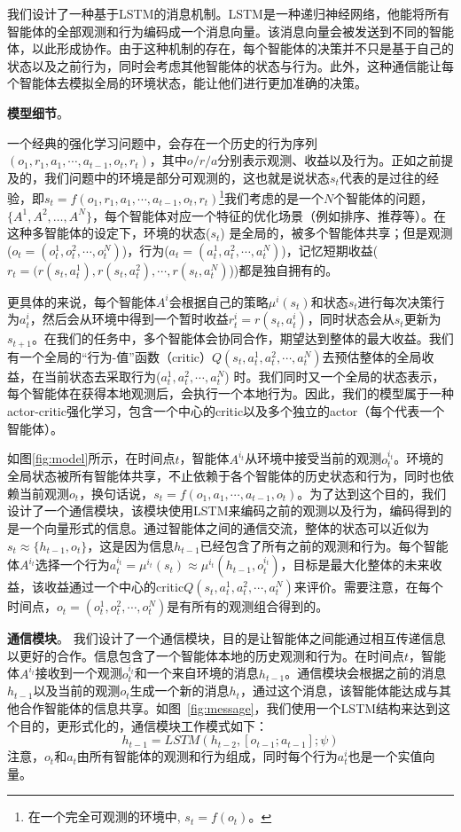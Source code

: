 我们设计了一种基于LSTM的消息机制。LSTM是一种递归神经网络，他能将所有智能体的全部观测和行为编码成一个消息向量。该消息向量会被发送到不同的智能体，以此形成协作。由于这种机制的存在，每个智能体的决策并不只是基于自己的状态以及之前行为，同时会考虑其他智能体的状态与行为。此外，这种通信能让每个智能体去模拟全局的环境状态，能让他们进行更加准确的决策。

\textbf{模型细节}。

一个经典的强化学习问题中，会存在一个历史的行为序列$(o_1, r_1, a_1, \cdots, a_{t-1}, o_t, r_t)$，其中$o/r/a$分别表示观测、收益以及行为。正如之前提及的，我们问题中的环境是部分可观测的，这也就是说状态$s_t$代表的是过往的经验，即$s_t=f(o_1, r_1, a_1, \cdots, a_{t-1}, o_t, r_t)$\footnote{在一个完全可观测的环境中, $s_t=f(o_t)$。}我们考虑的是一个$N$个智能体的问题，$\{A^1, A^2, \dots, A^N\}$，每个智能体对应一个特征的优化场景（例如排序、推荐等）。在这种多智能体的设定下，环境的状态($s_t$) 是全局的，被多个智能体共享；但是观测 ($o_t=(o^1_t,o^2_t,\cdots,o^N_t)$)，行为($a_t=(a^1_t,a^2_t,\cdots,a^N_t)$)，记忆短期收益($r_t=(r(s_t,a^1_t),r(s_t,a^2_t), \cdots, r(s_t,a^N_t)$))都是独自拥有的。

更具体的来说，每个智能体$A^i$会根据自己的策略$\mu^i(s_t)$和状态$s_t$进行每次决策行为$a^i_t$，然后会从环境中得到一个暂时收益$r^i_t = r(s_t, a^i_t)$，同时状态会从$s_t$更新为$s_{t+1}$。在我们的任务中，多个智能体会协同合作，期望达到整体的最大收益。我们有一个全局的“行为-值”函数（critic）$Q(s_t,a_t^1,a_t^2,\cdots,a_t^N)$去预估整体的全局收益，在当前状态去采取行为($a_t^1,a_t^2,\cdots,a_t^N$) 时。我们同时又一个全局的状态表示，每个智能体在获得本地观测后，会执行一个本地行为。因此，我们的模型属于一种actor-critic强化学习，包含一个中心的critic以及多个独立的actor（每个代表一个智能体）。

如图\ref{fig:model}所示，在时间点$t$，智能体$A^{i_t}$从环境中接受当前的观测$o^{i_t}_t$。环境的全局状态被所有智能体共享，不止依赖于各个智能体的历史状态和行为，同时也依赖当前观测$o_t$，换句话说，$s_t=f(o_1,a_1,\cdots,a_{t-1},o_t)$。为了达到这个目的，我们设计了一个通信模块，该模块使用LSTM来编码之前的观测以及行为，编码得到的是一个向量形式的信息。通过智能体之间的通信交流，整体的状态可以近似为$s_t \approx \{h_{t-1}, o_t\}$，这是因为信息$h_{t-1}$已经包含了所有之前的观测和行为。每个智能体$A^{i_t}$选择一个行为$a^{i_t}_t = \mu^{i_t}(s_t)\approx \mu^{i_t}(h_{t-1}, o^{i_t}_t)$，目标是最大化整体的未来收益，该收益通过一个中心的critic$Q(s_t, a^1_t,a^2_t,\cdots,a^N_t)$来评价。需要注意，在每个时间点，$o_t=(o^1_t,o^2_t,\cdots,o^N_t)$是有所有的观测组合得到的。

\textbf{通信模块}。
我们设计了一个通信模块，目的是让智能体之间能通过相互传递信息以更好的合作。信息包含了一个智能体本地的历史观测和行为。在时间点$t$，智能体$A^{i_t}$接收到一个观测$o^{i_t}_t$和一个来自环境的消息$h_{t-1}$。通信模块会根据之前的消息$h_{t-1}$以及当前的观测$o_t$生成一个新的消息$h_t$，通过这个消息，该智能体能达成与其他合作智能体的信息共享。如图~\ref{fig:message}，我们使用一个LSTM结构来达到这个目的，更形式化的，通信模块工作模式如下：
\begin{equation}
    h_{t-1}=LSTM(h_{t-2},[o_{t-1};a_{t-1}]; \psi)
\end{equation}
注意，$o_t$和$a_t$由所有智能体的观测和行为组成，同时每个行为$a^i_{t}$也是一个实值向量。

